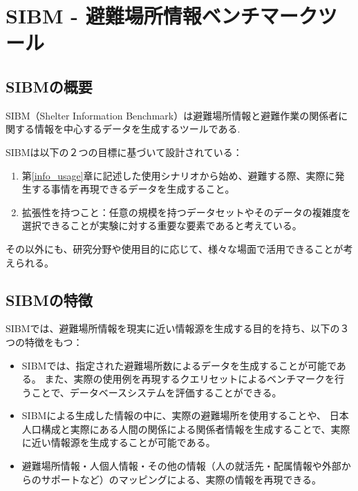 ﻿%
\chapter{SIBM - 避難場所情報ベンチマークツール}
\label{sibm_exp}

\section{SIBMの概要}
\label{sibm:definition}

SIBM（Shelter Information Benchmark）は避難場所情報と避難作業の関係者に関する情報を中心するデータを生成するツールである.

SIBMは以下の２つの目標に基づいて設計されている：

\begin{enumerate}
  \item
  第\ref{info_usage}章に記述した使用シナリオから始め、避難する際、実際に発生する事情を再現できるデータを生成すること。
  \item 拡張性を持つこと：任意の規模を持つデータセットやそのデータの複雑度を選択できることが実験に対する重要な要素であると考えている。
\end{enumerate}

その以外にも、研究分野や使用目的に応じて、様々な場面で活用できることが考えられる。

\section{SIBMの特徴}
\label{sibm:definition}

SIBMでは、避難場所情報を現実に近い情報源を生成する目的を持ち、以下の３つの特徴をもつ：

\begin{itemize}
	\item SIBMでは、指定された避難場所数によるデータを生成することが可能である。
	また、実際の使用例を再現するクエリセットによるベンチマークを行うことで、データベースシステムを評価することができる。
	\item SIBMによる生成した情報の中に、実際の避難場所を使用することや、
	日本人口構成と実際にある人間の関係による関係者情報を生成することで、実際に近い情報源を生成することが可能である。
	\item 避難場所情報・人個人情報・その他の情報（人の就活先・配属情報や外部からのサポートなど）のマッピングによる、実際の情報を再現できる。
\end{itemize}

